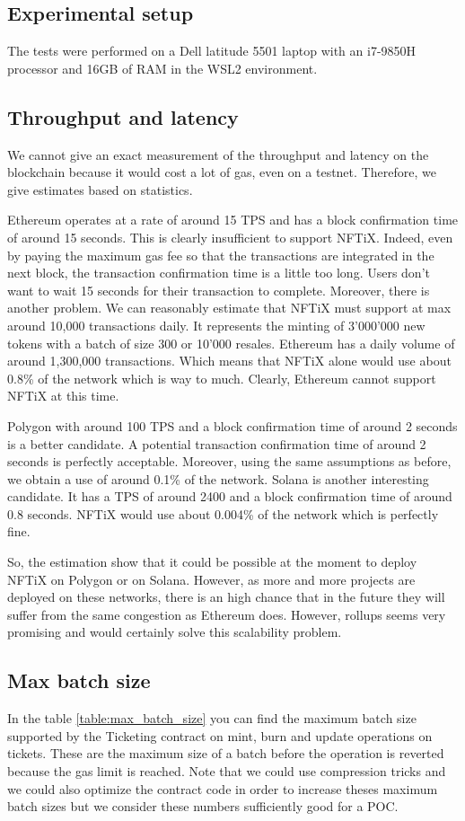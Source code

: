 \documentclass[a4paper,11pt,oneside]{report}
\begin{document}
\subsection{Experimental setup}
The tests were performed on a Dell latitude 5501 laptop with an i7-9850H processor and 16GB of RAM in the WSL2 environment.

\subsection{Throughput and latency}
We cannot give an exact measurement of the throughput and latency on the blockchain because it would cost a lot of gas, even on a testnet. Therefore, we give estimates based on statistics.

Ethereum operates at a rate of around 15 TPS and has a block confirmation time of around 15 seconds. This is clearly insufficient to support NFTiX. Indeed, even by paying the maximum gas fee so that the transactions are integrated in the next block, the transaction confirmation time is a little too long. Users don't want to wait 15 seconds for their transaction to complete. Moreover, there is another problem. We can reasonably estimate that NFTiX must support at max around 10,000 transactions daily. It represents the minting of 3'000'000 new tokens with a batch of size 300 or 10'000 resales. Ethereum has a daily volume of around 1,300,000 transactions. Which means that NFTiX alone would use about 0.8\% of the network which is way to much. Clearly, Ethereum cannot support NFTiX at this time.

Polygon with around 100 TPS and a block confirmation time of around 2 seconds is a better candidate. A potential transaction confirmation time of around 2 seconds is perfectly acceptable. Moreover, using the same assumptions as before, we obtain a use of around 0.1\% of the network. Solana is another interesting candidate. It has a TPS of around 2400 and a block confirmation time of around 0.8 seconds. NFTiX would use about 0.004\% of the network which is perfectly fine.

So, the estimation show that it could be possible at the moment to deploy NFTiX on Polygon or on Solana. However, as more and more projects are deployed on these networks, there is an high chance that in the future they will suffer from the same congestion as Ethereum does. However, rollups seems very promising and would certainly solve this scalability problem.

\subsection{Max batch size}
In the table \hyperref[table:max_batch_size]{\ref{table:max_batch_size}} you can find the maximum batch size supported by the Ticketing contract on mint, burn and update operations on tickets. These are the maximum size of a batch before the operation is reverted because the gas limit is reached. Note that we could use compression tricks and we could also optimize the contract code in order to increase theses maximum batch sizes but we consider these numbers sufficiently good for a POC.
\end{document}
